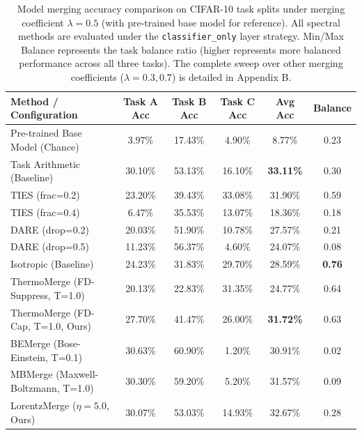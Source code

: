 \documentclass{article}
\theoremstyle{plain}
\theoremstyle{definition}
\theoremstyle{remark}
\begin{document}
\begin{table}[t]
\caption{Model merging accuracy comparison on CIFAR-10 task splits under merging coefficient $\lambda = 0.5$ (with pre-trained base model for reference). All spectral methods are evaluated under the \texttt{classifier\_only} layer strategy. Min/Max Balance represents the task balance ratio (higher represents more balanced performance across all three tasks). The complete sweep over other merging coefficients ($\lambda=0.3, 0.7$) is detailed in Appendix B.}
\label{tab:results}
\vskip 0.15in
\begin{center}
\begin{scriptsize}
\setlength{\tabcolsep}{4pt}
\begin{tabular}{lccccc}
\toprule
Method / Configuration & Task A Acc & Task B Acc & Task C Acc & Avg Acc & Balance \\
\midrule
Pre-trained Base Model (Chance) & 3.97\% & 17.43\% & 4.90\% & 8.77\% & 0.23 \\
\midrule
Task Arithmetic (Baseline) & 30.10\% & 53.13\% & 16.10\% & \textbf{33.11\%} & 0.30 \\
TIES (frac=0.2) & 23.20\% & 39.43\% & 33.08\% & 31.90\% & 0.59 \\
TIES (frac=0.4) & 6.47\% & 35.53\% & 13.07\% & 18.36\% & 0.18 \\
DARE (drop=0.2) & 20.03\% & 51.90\% & 10.78\% & 27.57\% & 0.21 \\
DARE (drop=0.5) & 11.23\% & 56.37\% & 4.60\% & 24.07\% & 0.08 \\
Isotropic (Baseline) & 24.23\% & 31.83\% & 29.70\% & 28.59\% & \textbf{0.76} \\
ThermoMerge (FD-Suppress, T=1.0) & 20.13\% & 22.83\% & 31.35\% & 24.77\% & 0.64 \\
ThermoMerge (FD-Cap, T=1.0, Ours) & 27.70\% & 41.47\% & 26.00\% & \textbf{31.72\%} & 0.63 \\
BEMerge (Bose-Einstein, T=0.1) & 30.63\% & 60.90\% & 1.20\% & 30.91\% & 0.02 \\
MBMerge (Maxwell-Boltzmann, T=1.0) & 30.30\% & 59.20\% & 5.20\% & 31.57\% & 0.09 \\
LorentzMerge ($\eta=5.0$, Ours) & 30.07\% & 53.03\% & 14.93\% & 32.67\% & 0.28 \\
\bottomrule
\end{tabular}
\end{scriptsize}
\end{center}
\vskip -0.15in
\end{table}
\end{document}
